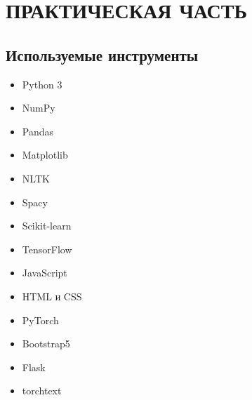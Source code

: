 \section{ПРАКТИЧЕСКАЯ ЧАСТЬ}
\vspace{-1.3cm}

\subsection{Используемые инструменты}

\begin{multicols}{3}
\begin{itemize}
 \item Python 3


 \item NumPy


 \item Pandas


 \item Matplotlib


 \item NLTK


 \item Spacy


 \item Scikit-learn


 \item TensorFlow


 \item JavaScript


 \item HTML и CSS


\item PyTorch


\item Bootstrap5


\item Flask


\item torchtext
\end{itemize}
\end{multicols}


